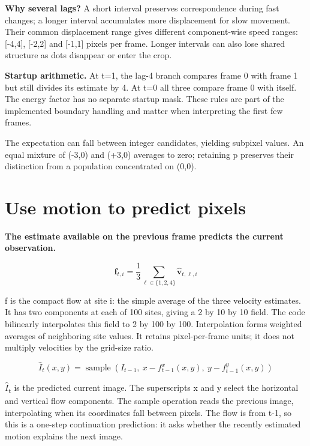 \documentclass[11pt,letterpaper]{article}
\begin{document}
\textbf{Why several lags?} A short interval preserves correspondence during fast changes; a longer interval accumulates more displacement for slow movement. Their common displacement range gives different component-wise speed ranges: [-4,4], [-2,2] and [-1,1] pixels per frame. Longer intervals can also lose shared structure as dots disappear or enter the crop.


\textbf{Startup arithmetic.} At t=1, the lag-4 branch compares frame 0 with frame 1 but still divides its estimate by 4. At t=0 all three compare frame 0 with itself. The energy factor has no separate startup mask. These rules are part of the implemented boundary handling and matter when interpreting the first few frames.


{
\small\color{muted} The expectation can fall between integer candidates, yielding subpixel values. An equal mixture of (-3,0) and (+3,0) averages to zero; retaining p preserves their distinction from a population concentrated on (0,0).\par}


\clearpage

\section{Use motion to predict pixels}\label{sec9}

\textbf{The estimate available on the previous frame predicts the current observation.}


\begin{equation}\mathbf f_{t,i}=\frac13\sum_{\ell\in\{1,2,4\}}\widehat{\mathbf v}_{t,\ell,i}\end{equation}

f is the compact flow at site i: the simple average of the three velocity estimates. It has two components at each of 100 sites, giving a 2 by 10 by 10 field. The code bilinearly interpolates this field to 2 by 100 by 100. Interpolation forms weighted averages of neighboring site values. It retains pixel-per-frame units; it does not multiply velocities by the grid-size ratio.


\begin{equation}\widehat I_t(x,y)=\operatorname{sample}\left(I_{t-1},\ x-f^x_{t-1}(x,y),\ y-f^y_{t-1}(x,y)\right)\end{equation}

\(\widehat I\)\textsubscript{t} is the predicted current image. The superscripts x and y select the horizontal and vertical flow components. The sample operation reads the previous image, interpolating when its coordinates fall between pixels. The flow is from t-1, so this is a one-step continuation prediction: it asks whether the recently estimated motion explains the next image.
\end{document}
